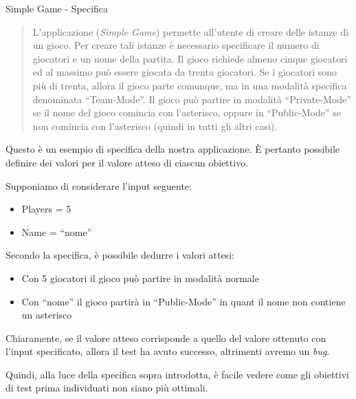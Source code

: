 \begin{example}{}{Simple Game - Specifica}
    \begin{quotation}
    L'applicazione (\textit{Simple Game}) permette all'utente di creare delle istanze di un gioco. Per creare tali istanze è necessario specificare il numero di giocatori e un nome della partita. Il gioco richiede almeno cinque giocatori ed al massimo può essere giocata da trenta giocatori. Se i giocatori sono più di trenta, allora il gioco parte comunque, ma in una modalità specifica denominata ``Team-Mode''. Il gioco può partire in modalità ``Private-Mode'' se il nome del gioco comincia con l'asterisco, oppure in ``Public-Mode'' se non comincia con l'asterisco (quindi in tutti gli altri casi).
    \end{quotation}

    Questo è un esempio di specifica della nostra applicazione. È pertanto possibile definire dei valori per il valore atteso di ciascun obiettivo.

    Supponiamo di considerare l'input seguente:

    \begin{itemize}
        \item Players = 5
        \item Name = ``nome''
    \end{itemize}

    Secondo la specifica, è possibile dedurre i valori attesi:

    \begin{itemize}
        \item Con 5 giocatori il gioco può partire in modalità normale
        \item Con ``nome'' il gioco partirà in ``Public-Mode'' in quant il nome non contiene un asterisco
    \end{itemize}

    Chiaramente, se il valore atteso corrisponde a quello del valore ottenuto con l'input specificato, allora il test ha avuto successo, altrimenti avremo un \textit{bug}.

    Quindi, alla luce della specifica sopra introdotta, è facile vedere come gli obiettivi di test prima individuati non siano più ottimali.


\end{example}
